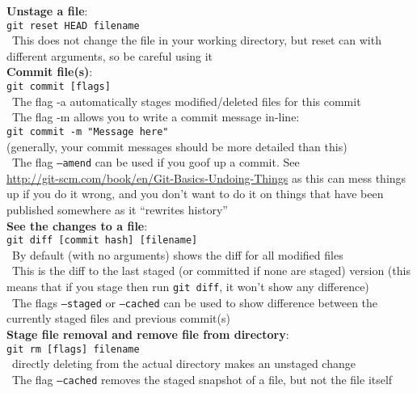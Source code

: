 \documentclass[12pt]{article}
\begin{document}
{{\bf Unstage a file}:\\
\texttt{git reset HEAD filename}\\
\textbullet\, This does not change the file in your working directory, but reset can with different arguments, so be careful using it\\

\newpage
{\bf Commit file(s)}:\\
\texttt{git commit [flags]}\\
\textbullet\, The flag -a automatically stages modified/deleted files for this commit\\
\textbullet\, The flag -m allows you to write a commit message in-line:\\
 \hspace*{6mm}\texttt{git commit -m "Message here"}\\
 (generally, your commit messages should be more detailed than this)\\
\textbullet\, The flag \texttt{--amend} can be used if you goof up a commit. See\\ \url{http://git-scm.com/book/en/Git-Basics-Undoing-Things} as this can mess things up if you do it wrong, and you don't want to do it on things that have been published somewhere as it ``rewrites history''\\

{\bf See the changes to a file}:\\
\texttt{git diff [commit hash] [filename]}\\
\textbullet\, By default (with no arguments) shows the diff for all modified files\\
\textbullet\, This is the diff to the last staged (or committed if none are staged) version (this means that if you stage then run \texttt{git diff}, it won't show any difference)\\
\textbullet\, The flags \texttt{--staged} or \texttt{--cached} can be used to show difference between the currently staged files and previous commit(s)\\

{\bf Stage file removal and remove file from directory}:\\
\texttt{git rm [flags] filename}\\
\textbullet\, directly deleting from the actual directory makes an unstaged change\\
\textbullet\, The flag \texttt{--cached} removes the staged snapshot of a file, but not the file itself\\

}
\end{document}
